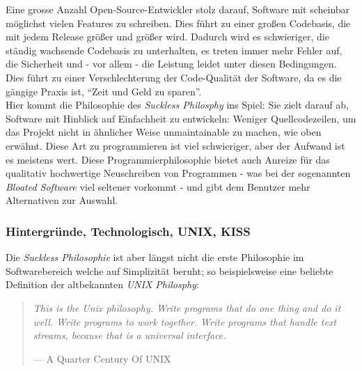 \documentclass[a4paper,11pt]{article}
\newenvironment{nicequote}[2]{
    \begin{center}\begin{quote}\textit{#1}\\\par\raggedleft--- {#2}
    }{
    \end{quote}\end{center}
}
\begin{document}
Eine grosse Anzahl Open-Source-Entwickler stolz darauf, Software mit scheinbar möglichst vielen Features zu schreiben. Dies führt zu einer großen Codebasis, die mit jedem Release größer und größer wird. Dadurch wird es schwieriger, die ständig wachsende Codebasis zu unterhalten, es treten immer mehr Fehler auf, die Sicherheit und - vor allem - die Leistung leidet unter diesen Bedingungen. Dies führt zu einer Verschlechterung der Code-Qualität der Software, da es die gängige Praxis ist, ``Zeit und Geld zu sparen''. \cite{bhattacharya2020}\\



Hier kommt die Philosophie des \textit{Suckless Philosphy} ins Spiel: Sie zielt darauf ab, Software mit Hinblick auf Einfachheit zu entwickeln: Weniger Quellcodezeilen, um das Projekt nicht in ähnlicher Weise unmaintainable zu machen, wie oben erwähnt. Diese Art zu programmieren ist viel schwieriger, aber der Aufwand ist es meistens wert. Diese Programmierphilosophie bietet auch Anreize für das qualitativ hochwertige Neuschreiben von Programmen - was bei der sogenannten \textit{Bloated Software \cite{bhattacharya2020}} viel seltener vorkommt - und gibt dem Benutzer mehr Alternativen zur Auswahl.

\subsubsection{Hintergründe, Technologisch, UNIX, KISS}
Die \textit{Suckless Philosophie} ist aber längst nicht die erste Philosophie im Softwarebereich welche auf Simplizität beruht; so beispielsweise eine beliebte Definition der altbekannten \textit{UNIX Philosphy}:

\begin{nicequote}{This is the Unix philosophy. Write programs that do one thing and do it well. Write programs to work together. Write programs that handle text streams, because that is a universal interface.}{A Quarter Century Of UNIX \cite{salus1994}}
\end{nicequote}
\end{document}
